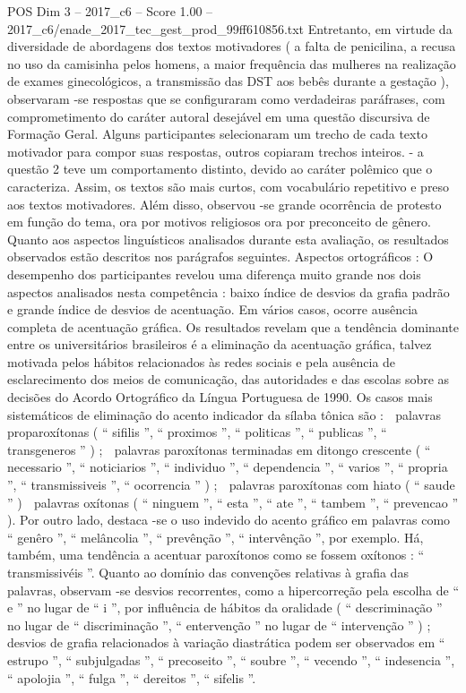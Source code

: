 \begin{textsample}{POS Dim 3 – 2017\_c6 – Score 1.00 – 2017\_c6/enade\_2017\_tec\_gest\_prod\_99ff610856.txt}
Entretanto, em virtude da diversidade de abordagens dos textos motivadores ( a falta de penicilina, a recusa no uso da camisinha pelos homens, a maior frequência das mulheres na realização de exames ginecológicos, a transmissão das DST aos bebês durante a gestação ), observaram -se respostas que se configuraram como verdadeiras paráfrases, com comprometimento do caráter autoral desejável em uma questão discursiva de Formação Geral.
Alguns participantes selecionaram um trecho de cada texto motivador para compor suas respostas, outros copiaram trechos inteiros. - a questão 2 teve um comportamento distinto, devido ao caráter polêmico que o caracteriza.
Assim, os textos são mais curtos, com vocabulário repetitivo e preso aos textos motivadores.
Além disso, observou -se grande ocorrência de protesto em função do tema, ora por motivos religiosos ora por preconceito de gênero.
Quanto aos aspectos linguísticos analisados durante esta avaliação, os resultados observados estão descritos nos parágrafos seguintes.
Aspectos ortográficos : O desempenho dos participantes revelou uma diferença muito grande nos dois aspectos analisados nesta competência : baixo índice de desvios da grafia padrão e grande índice de desvios de acentuação.
Em vários casos, ocorre ausência completa de acentuação gráfica.
Os resultados revelam que a tendência dominante entre os universitários brasileiros é a eliminação da acentuação gráfica, talvez motivada pelos hábitos relacionados às redes sociais e pela ausência de esclarecimento dos meios de comunicação, das autoridades e das escolas sobre as decisões do Acordo Ortográfico da Língua Portuguesa de 1990.
Os casos mais sistemáticos de eliminação do acento indicador da sílaba tônica são :  palavras proparoxítonas ( “ sifilis ”, “ proximos ”, “ politicas ”, “ publicas ”, “ transgeneros ” ) ;  palavras paroxítonas terminadas em ditongo crescente ( “ necessario ”, “ noticiarios ”, “ individuo ”, “ dependencia ”, “ varios ”, “ propria ”, “ transmissiveis ”, “ ocorrencia ” ) ;  palavras paroxítonas com hiato ( “ saude ” )  palavras oxítonas ( “ ninguem ”, “ esta ”, “ ate ”, “ tambem ”, “ prevencao ” ).
Por outro lado, destaca -se o uso indevido do acento gráfico em palavras como “ genêro ”, “ melâncolia ”, “ prevênção ”, “ intervênção ”, por exemplo.
Há, também, uma tendência a acentuar paroxítonos como se fossem oxítonos : “ transmissivéis ”.
Quanto ao domínio das convenções relativas à grafia das palavras, observam -se desvios recorrentes, como a hipercorreção pela escolha de “ e ” no lugar de “ i ”, por influência de hábitos da oralidade ( “ descriminação ” no lugar de “ discriminação ”, “ entervenção ” no lugar de “ intervenção ” ) ; desvios de grafia relacionados à variação diastrática podem ser observados em “ estrupo ”, “ subjulgadas ”, “ precoseito ”, “ soubre ”, “ vecendo ”, “ indesencia ”, “ apolojia ”, “ fulga ”, “ dereitos ”, “ sifelis ”.

\end{textsample}

